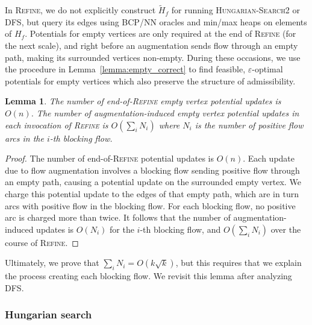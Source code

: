 \documentclass[11pt]{article}
\def\eps{\varepsilon}
\theoremstyle{plain}
\newtheorem{lemma}{Lemma}[section]
\numberwithin{figure}{section}
\begin{document}
In \textsc{Refine}, we do not explicitly construct $\tilde{H}_f$ for running
\textsc{Hungarian-Search2} or \textsc{DFS}, but query its edges using BCP/NN
oracles and min/max heaps on elements of $H_f$.
Potentials for empty vertices are only required at the end of \textsc{Refine}
(for the next scale), and right before an augmentation sends flow through an
empty path, making its surrounded vertices non-empty.
During these occasions, we use the procedure in Lemma~\ref{lemma:empty_correct}
to find feasible, $\eps$-optimal potentials for empty vertices which
also preserve the structure of admissibility.

\begin{lemma}
\label{lemma:empty_updates}
The number of end-of-\textsc{Refine} empty vertex potential updates is $O(n)$.
The number of augmentation-induced empty vertex potential updates in each
invocation of \textsc{Refine} is $O(\sum_i N_i)$ where $N_i$ is the number
of positive flow arcs in the $i$-th blocking flow.
\end{lemma}

\begin{proof}
The number of end-of-\textsc{Refine} potential updates is $O(n)$.
Each update due to flow augmentation involves a blocking flow sending positive
flow through an empty path, causing a potential update on the surrounded
empty vertex.
We charge this potential update to the edges of that empty path, which are in
turn arcs with positive flow in the blocking flow.
For each blocking flow, no positive arc is charged more than twice.
It follows that the number of augmentation-induced updates is $O(N_i)$ for the
$i$-th blocking flow, and $O(\sum_i N_i)$ over the course of \textsc{Refine}.
\end{proof}

Ultimately, we prove that $\sum_i N_i = O(k\sqrt{k})$, but this requires that
we explain the process creating each blocking flow.
We revisit this lemma after analyzing \textsc{DFS}.

\subsubsection{Hungarian search}
\end{document}
